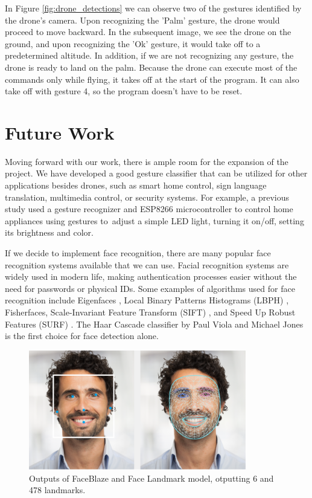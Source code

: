 In Figure \ref{fig:drone_detections} we can observe two of the gestures identified by the drone's camera. Upon recognizing the 'Palm' gesture, the drone would proceed to move backward. In the subsequent image, we see the drone on the ground, and upon recognizing the 'Ok' gesture, it would take off to a predetermined altitude.
In addition, if we are not recognizing any gesture, the drone is ready to land on the palm. Because the drone can execute most of the commands only while flying, it takes off at the start of the program. It can also take off with gesture 4, so the program doesn't have to be reset.


\section{Future Work}
Moving forward with our work, there is ample room for the expansion of the project. We have developed a good gesture classifier that can be utilized for other applications besides drones, such as smart home control, sign language translation, multimedia control, or security systems. For example, a previous study \cite{doi:10.1080/08839514.2023.2176607} used a gesture recognizer and ESP8266 microcontroller to control home appliances using gestures to~adjust a simple LED light, turning it on/off, setting its brightness and color.

If we decide to implement face recognition, there are many popular face recognition systems available that we can use. Facial recognition systems are widely used in modern life, making authentication processes easier without the need for passwords or physical IDs. Some examples of algorithms used for face recognition include Eigenfaces \cite{CARIKCI2012118}, Local Binary Patterns Histograms (LBPH) \cite{inproceedings}, Fisherfaces, Scale-Invariant Feature Transform (SIFT) \cite{articlefr}, and Speed Up Robust Features (SURF) \cite{10.1007/11744023_32}. The Haar Cascade classifier by Paul Viola and Michael Jones \cite{inproceedings} is the first choice for face detection alone.


\begin{figure}[h]
	\centering
	\includegraphics[width=0.85\textwidth]{images/face_landmark.png}
	\caption{Outputs of FaceBlaze and Face Landmark model, otputting 6 and 478 landmarks.}
	\label{fig:face_landmark}
\end{figure}


